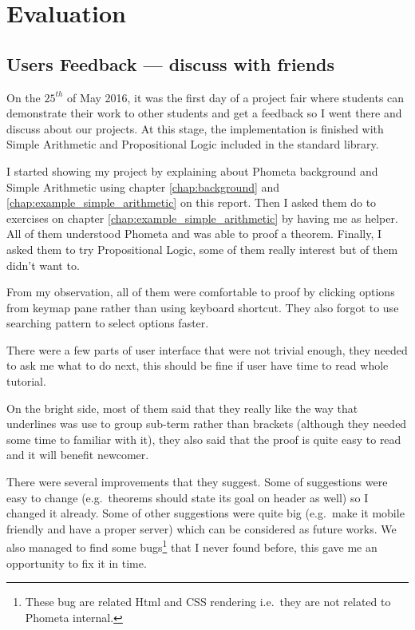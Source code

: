 \documentclass[master.tex]{subfiles}
\begin{document}
\chapter{Evaluation}

\section{Users Feedback --- discuss with friends}

On the $25^{th}$ of May 2016, it was the first day of a project fair where
students can demonstrate their work to other students and get a feedback so I
went there and discuss about our projects. At this stage, the implementation is
finished with Simple Arithmetic and Propositional Logic included in the standard
library.

I started showing my project by explaining about Phometa background and Simple
Arithmetic using chapter \ref{chap:background} and
\ref{chap:example_simple_arithmetic} on this report. Then I asked them do to
exercises on chapter \ref{chap:example_simple_arithmetic} by having me as
helper. All of them understood Phometa and was able to proof a theorem. Finally,
I asked them to try Propositional Logic, some of them really interest but of
them didn't want to.

From my observation, all of them were comfortable to proof by clicking options
from keymap pane rather than using keyboard shortcut. They also forgot to use
searching pattern to select options faster.

There were a few parts of user interface that were not trivial enough, they
needed to ask me what to do next, this should be fine if user have time to read
whole tutorial.

On the bright side, most of them said that they really like the way that
underlines was use to group sub-term rather than brackets (although they needed
some time to familiar with it), they also said that the proof is quite easy to
read and it will benefit newcomer.

There were several improvements that they suggest. Some of suggestions
were easy to change (e.g.\ theorems should state its goal on header as well) so
I changed it already. Some of other suggestions were quite big (e.g.\ make it
mobile friendly and have a proper server) which can be considered as future
works. We also managed to find some bugs\footnote{These bug are
  related Html and CSS rendering i.e.\ they are not related to Phometa internal.} that I never found before,
this gave me an opportunity to fix it in time.
\end{document}
